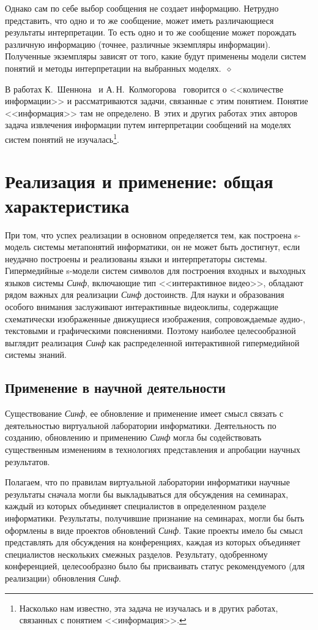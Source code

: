 \begin{multicols}{2}
Однако сам по себе выбор сообщения не создает информацию. Нетрудно
представить, что одно и то же сообщение, может иметь различающиеся
результаты интерпретации. То есть одно и то же сообщение может порождать
различную информацию (точнее, различные экземпляры информации).
Полученные экземпляры зависят от того, какие будут применены модели
систем понятий и методы интерпретации на выбранных моделях.~$\diamond$

В работах К.~Шеннона~\cite{11il} и А.\,Н.~Колмогорова~\cite{13il} говорится о 
<<количестве информации>> и рассматриваются задачи, связанные с этим понятием. 
Понятие <<информация>> там не определено. В~этих и других работах этих авторов 
задача извлечения информации путем интерпретации сообщений на моделях систем 
понятий не изучалась\footnote{Насколько нам известно, эта задача не изучалась и 
в других работах, связанных с понятием <<информация>>.}.

\section{Реализация и применение: общая характеристика}

При том, что успех реализации в основном определяется тем, как построена
s-модель системы метапонятий информатики, он не может быть достигнут, если 
неудачно построены и реализованы языки и интерпретаторы системы. Гипермедийные 
s-модели систем символов для построения входных и выходных языков системы 
\textit{Синф}, включающие тип <<интерактивное видео>>, обладают рядом важных 
для реализации \textit{Синф} достоинств. Для науки и образования особого 
внимания заслуживают интерактивные видеоклипы, содержащие схематически 
изображенные движущиеся изображения, сопровождаемые аудио-, текстовыми и 
графическими пояснениями. Поэтому наиболее целесообразной выглядит реализация 
\textit{Синф} как распределенной интерактивной гипермедийной системы знаний.

\subsection{Применение в научной деятельности } %

Существование \textit{Синф}, ее обновление и применение имеет смысл
связать с деятельностью виртуальной лаборатории информатики. Деятельность
по созданию, обновлению и применению \textit{Синф} могла бы содействовать
существенным изменениям в технологиях представления и апробации научных
результатов.

Полагаем, что по правилам виртуальной лаборатории информатики научные
результаты сначала могли бы выкладываться для обсуждения на семинарах,
каждый из которых объединяет специалистов в определенном разделе
информатики. Результаты, получившие признание на семинарах, могли бы
быть оформлены в виде проектов обновлений \textit{Синф}. Такие проекты
имело бы смысл представлять для обсуждения на конференциях, каждая из
которых объединяет специалистов нескольких смежных разделов. Результату,
одобренному конференцией, целесообразно было бы присваивать статус
рекомендуемого (для реализации) обновления \textit{Синф}.


\end{multicols}

